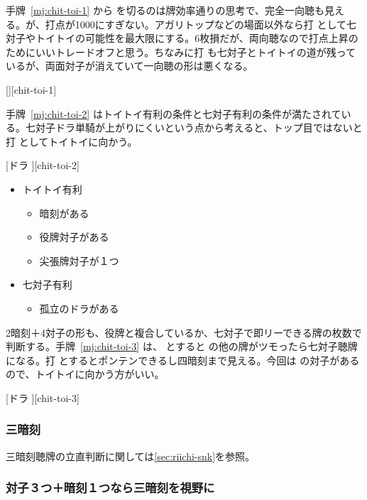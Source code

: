 \documentclass[../nankiru_main.tex]{subfiles}
\begin{document}
手牌~\ref{mj:chit-toi-1} から  を切るのは牌効率通りの思考で、完全一向聴も見える。が、打点が1000にすぎない。アガリトップなどの場面以外なら打  として七対子やトイトイの可能性を最大限にする。6枚損だが、両向聴なので打点上昇のためにいいトレードオフと思う。ちなみに打  も七対子とトイトイの道が残っているが、両面対子が消えていて一向聴の形は悪くなる\citep{gendai-toitoi}。

[][chit-toi-1]

手牌~\ref{mj:chit-toi-2} はトイトイ有利の条件と七対子有利の条件が満たされている。七対子ドラ単騎が上がりにくいという点から考えると、トップ目ではないと打  としてトイトイに向かう\citep{gendai-toitoi}。

[ドラ ][chit-toi-2]

\begin{itemize}
  \item トイトイ有利
  \begin{itemize}
    \item 暗刻がある
    \item 役牌対子がある
    \item 尖張牌対子が１つ
  \end{itemize}
  \item 七対子有利
  \begin{itemize}
    \item 孤立のドラがある
  \end{itemize}
\end{itemize}

2暗刻＋4対子の形も、役牌と複合しているか、七対子で即リーできる牌の枚数で判断する。手牌~\ref{mj:chit-toi-3} は、 とすると  の他の牌がツモったら七対子聴牌になる。打  とするとポンテンできるし四暗刻まで見える。今回は  の対子があるので、トイトイに向かう方がいい。

[ドラ ][chit-toi-3]

\subsubsection{三暗刻}

三暗刻聴牌の立直判断に関しては\ref{sec:riichi-snk}を参照。

\subsubsection*{対子３つ＋暗刻１つなら三暗刻を視野に}
\end{document}
